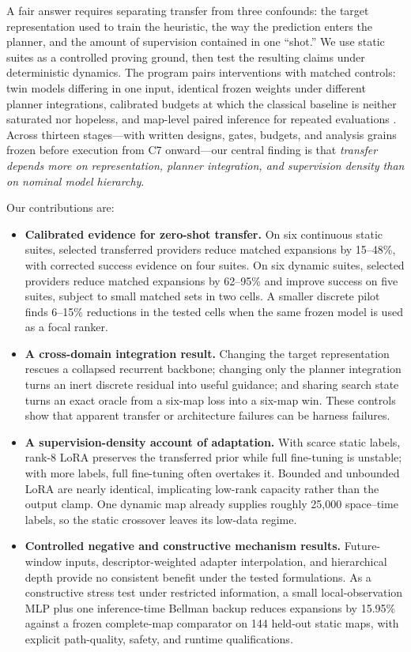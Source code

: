 \documentclass[letterpaper]{article} %
\newcommand{\stage}[1]{\textsc{#1}}
\begin{document}
A fair answer requires separating transfer from three confounds: the target representation used to train the heuristic, the way the prediction enters the planner, and the amount of supervision contained in one ``shot.'' We use static suites as a controlled proving ground, then test the resulting claims under deterministic dynamics. The program pairs interventions with matched controls: twin models differing in one input, identical frozen weights under different planner integrations, calibrated budgets at which the classical baseline is neither saturated nor hopeless, and map-level paired inference for repeated evaluations \citep{henderson2018matters,agarwal2021precipice,pineau2021reproducibility}. Across thirteen stages---with written designs, gates, budgets, and analysis grains frozen before execution from \stage{C7} onward---our central finding is that \emph{transfer depends more on representation, planner integration, and supervision density than on nominal model hierarchy}.

Our contributions are:
\begin{itemize}
    \item \textbf{Calibrated evidence for zero-shot transfer.} On six continuous static suites, selected transferred providers reduce matched expansions by 15--48\%, with corrected success evidence on four suites. On six dynamic suites, selected providers reduce matched expansions by 62--95\% and improve success on five suites, subject to small matched sets in two cells. A smaller discrete pilot finds 6--15\% reductions in the tested cells when the same frozen model is used as a focal ranker.
    \item \textbf{A cross-domain integration result.} Changing the target representation rescues a collapsed recurrent backbone; changing only the planner integration turns an inert discrete residual into useful guidance; and sharing search state turns an exact oracle from a six-map loss into a six-map win. These controls show that apparent transfer or architecture failures can be harness failures.
    \item \textbf{A supervision-density account of adaptation.} With scarce static labels, rank-8 LoRA preserves the transferred prior while full fine-tuning is unstable; with more labels, full fine-tuning often overtakes it. Bounded and unbounded LoRA are nearly identical, implicating low-rank capacity rather than the output clamp. One dynamic map already supplies roughly 25{,}000 space--time labels, so the static crossover leaves its low-data regime.
    \item \textbf{Controlled negative and constructive mechanism results.} Future-window inputs, descriptor-weighted adapter interpolation, and hierarchical depth provide no consistent benefit under the tested formulations. As a constructive stress test under restricted information, a small local-observation MLP plus one inference-time Bellman backup reduces expansions by 15.95\% against a frozen complete-map comparator on 144 held-out static maps, with explicit path-quality, safety, and runtime qualifications.
\end{itemize}
\end{document}
